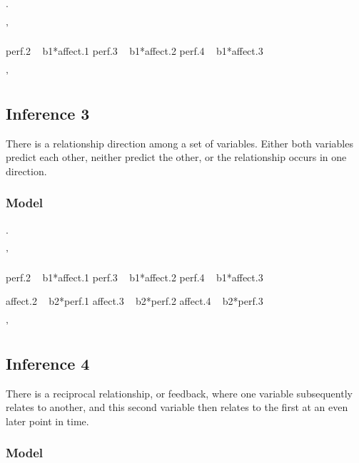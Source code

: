 \documentclass[english,,man]{apa6}
\newenvironment{Shaded}{\begin{snugshade}}{\end{snugshade}}
\newcommand{\StringTok}[1]{\textcolor[rgb]{0.31,0.60,0.02}{#1}}
\theoremstyle{definition}
\theoremstyle{definition}
\theoremstyle{definition}
\theoremstyle{remark}
\begin{document}
.

\begin{Shaded}
\begin{Highlighting}[]
\StringTok{'}

\StringTok{perf.2 ~ b1*affect.1}
\StringTok{perf.3 ~ b1*affect.2}
\StringTok{perf.4 ~ b1*affect.3}

\StringTok{'}
\end{Highlighting}
\end{Shaded}

\hypertarget{inference-3-1}{%
\subsection{Inference 3}\label{inference-3-1}}

There is a relationship direction among a set of variables. Either both
variables predict each other, neither predict the other, or the
relationship occurs in one direction.

\hypertarget{model-11}{%
\subsubsection{Model}\label{model-11}}

.

\begin{Shaded}
\begin{Highlighting}[]
\StringTok{'}

\StringTok{perf.2 ~ b1*affect.1}
\StringTok{perf.3 ~ b1*affect.2}
\StringTok{perf.4 ~ b1*affect.3}

\StringTok{affect.2 ~ b2*perf.1}
\StringTok{affect.3 ~ b2*perf.2}
\StringTok{affect.4 ~ b2*perf.3}

\StringTok{'}
\end{Highlighting}
\end{Shaded}

\hypertarget{inference-4-1}{%
\subsection{Inference 4}\label{inference-4-1}}

There is a reciprocal relationship, or feedback, where one variable
subsequently relates to another, and this second variable then relates
to the first at an even later point in time.

\hypertarget{model-12}{%
\subsubsection{Model}\label{model-12}}
\end{document}

